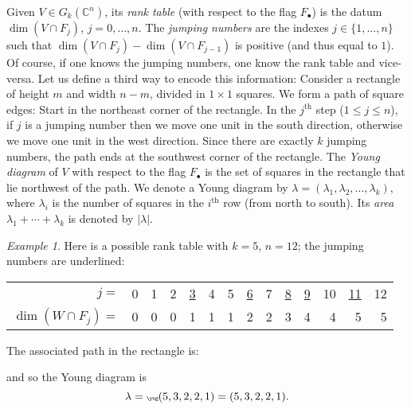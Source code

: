 \documentclass[10pt, a4paper]{amsart}
\theoremstyle{plain}
\theoremstyle{definition}
\theoremstyle{remark}
\theoremstyle{note}
\newtheorem{example}[lemma]{Example}
\numberwithin{equation}{section}
\begin{document}
Given $V \in G_k ({\mathbb{C}}^n)$, 
its \emph{rank table} (with respect to the flag $F_\bullet$)
is the datum $\dim (V \cap F_j)$, $j=0,\dots,n$.
The \emph{jumping numbers} are
the indexes $j \in \{1,\dots,n\}$ such that 
$\dim (V \cap F_j) - \dim (V \cap F_{j-1})$ is positive (and thus equal to $1$).
Of course, if one knows the jumping numbers, one know the rank table and vice-versa.
Let us define a third way to encode this information:
Consider a rectangle of height $m$ and width $n-m$, divided in $1 \times 1$ squares.
We form a path of square edges:
Start in the northeast corner of the rectangle.
In the $j^\text{th}$ step ($1 \le j \le n$),
if $j$ is a jumping number then we move one unit in the south direction,
otherwise we move one unit in the west direction.
Since there are exactly $k$ jumping numbers, 
the path ends at the southwest corner of the rectangle.
The \emph{Young diagram} of $V$ with respect to the flag $F_\bullet$ is 
the set of squares in the rectangle that lie northwest of the path.
We denote a Young diagram by $\lambda = (\lambda_1, \lambda_2, \dots, \lambda_k)$,
where $\lambda_i$ is the number of squares in the $i^\text{th}$ row (from north to south).
Its \emph{area} $\lambda_1+\cdots+\lambda_k$ is denoted by $|\lambda|$.

\begin{example}\label{ex.Young}
Here is a possible rank table with $k=5$, $n=12$;
the jumping numbers are underlined:
\begin{center}
\begin{tabular}{rrrrrrrrrrrrrr}
$j = $                 & 0 & 1 & 2 & \underline{3} & 4 & 5 & \underline{6} & 7 & \underline{8} & \underline{9} & 10 & \underline{11} & 12 \\
$\dim (W \cap F_j)=$ & 0 & 0 & 0 &       1 & 1 & 1 &       2 & 2 &        3 &      4 &  4 &        5 &  5 \\
\end{tabular}
\end{center}
The associated path in the rectangle is:
\setlength{\unitlength}{.4cm}
\begin{center}
\end{center}
and so the Young diagram is $$\lambda=\tiny{\yng(5,3,2,2,1)} = (5,3,2,2,1).$$
\end{example}
\end{document}
